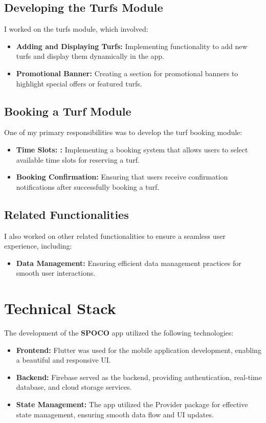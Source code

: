 \documentclass[12pt,a4paper]{report}
\begin{document}
\subsection{Developing the Turfs Module}
I worked on the turfs module, which involved:
\begin{itemize}
    \item \textbf{Adding and Displaying Turfs:}  Implementing functionality to add new turfs and display them dynamically in the app.
    \item \textbf{Promotional Banner:} Creating a section for promotional banners to highlight special offers or featured turfs.
\end{itemize}

\subsection{Booking a Turf Module}
One of my primary responsibilities was to develop the turf booking module:
\begin{itemize}
    \item \textbf{Time Slots: :}  Implementing a booking system that allows users to select available time slots for reserving a turf.
    \item \textbf{Booking Confirmation:} Ensuring that users receive confirmation notifications after successfully booking a turf.
\end{itemize}

\subsection{Related Functionalities}
I also worked on other related functionalities to ensure a seamless user experience, including:
\begin{itemize}
    \item \textbf{Data Management:} Ensuring efficient data management practices for smooth user interactions.
\end{itemize}

\section{Technical Stack}
The development of the \textbf{SPOCO} app utilized the following technologies:

\begin{itemize}
    \item \textbf{Frontend: } Flutter was used for the mobile application development, enabling a beautiful and responsive UI.
    \item \textbf{Backend:} Firebase served as the backend, providing authentication, real-time database, and cloud storage services.
    \item \textbf{State Management:} The app utilized the Provider package for effective state management, ensuring smooth data flow and UI updates.
\end{itemize}
\end{document}
